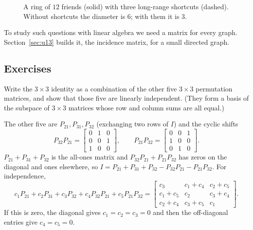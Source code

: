 \begin{figure}[ht]\centering
{}
\caption{A ring of $12$ friends (solid) with three long-range shortcuts (dashed). Without shortcuts
the diameter is $6$; with them it is $3$.}
\label{fig:u12-ring}
\end{figure}

To study such questions with linear algebra we need a matrix for every graph. Section~\ref{sec:u13}
builds it, the incidence matrix, for a small directed graph.

\subsection{Exercises}

\begin{exercise}\label{exr:u12-perm}
Write the $3\times3$ identity as a combination of the other five $3\times3$ permutation matrices,
and show that those five are linearly independent. (They form a basis of the subspace of
$3\times3$ matrices whose row and column sums are all equal.)
\end{exercise}
\begin{solution}
The other five are $P_{21},P_{31},P_{32}$ (exchanging two rows of $I$) and the cyclic shifts
\[
P_{32}P_{21}=\begin{bmatrix}0&1&0\\0&0&1\\1&0&0\end{bmatrix},\qquad
P_{21}P_{32}=\begin{bmatrix}0&0&1\\1&0&0\\0&1&0\end{bmatrix}.
\]
$P_{21}+P_{31}+P_{32}$ is the all-ones matrix and $P_{32}P_{21}+P_{21}P_{32}$ has zeros on the diagonal
and ones elsewhere, so $I=P_{21}+P_{31}+P_{32}-P_{32}P_{21}-P_{21}P_{32}$. For independence,
\[
c_1P_{21}+c_2P_{31}+c_3P_{32}+c_4P_{32}P_{21}+c_5P_{21}P_{32}=
\begin{bmatrix}c_3&c_1+c_4&c_2+c_5\\c_1+c_5&c_2&c_3+c_4\\c_2+c_4&c_3+c_5&c_1\end{bmatrix}.
\]
If this is zero, the diagonal gives $c_1=c_2=c_3=0$ and then the off-diagonal entries give
$c_4=c_5=0$.
\end{solution}

